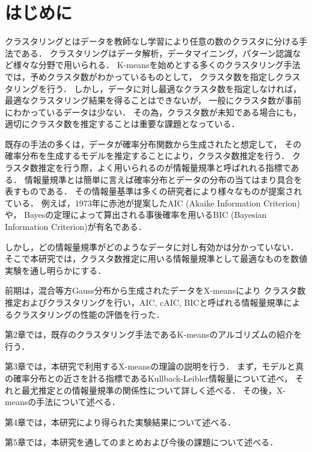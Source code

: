 \section{はじめに}
クラスタリングとはデータを教師なし学習により任意の数のクラスタに分ける手法である．
クラスタリングはデータ解析，データマイニング，パターン認識など様々な分野で用いられる．
K-meansを始めとする多くのクラスタリング手法では，予めクラスタ数がわかっているものとして，
クラスタ数を指定しクラスタリングを行う．
しかし，データに対し最適なクラスタ数を指定しなければ，最適なクラスタリング結果を得ることはできないが，
一般にクラスタ数が事前にわかっているデータは少ない．
その為，クラスタ数が未知である場合にも，適切にクラスタ数を推定することは重要な課題となっている．

既存の手法の多くは，データが確率分布関数から生成されたと想定して，
その確率分布を生成するモデルを推定することにより，クラスタ数推定を行う．
クラスタ数推定を行う際，よく用いられるのが情報量規準と呼ばれれる指標である．
情報量規準とは簡単に言えば確率分布とデータの分布の当てはまり具合を表すものである．
その情報量基準は多くの研究者により様々なものが提案されている．
例えば，1973年に赤池が提案したAIC (Akaike Information Criterion) や，
Bayesの定理によって算出される事後確率を用いるBIC (Bayesian Information Criterion)が有名である．

しかし，どの情報量規準がどのようなデータに対し有効かは分かっていない．
そこで本研究では，クラスタ数推定に用いる情報量規準として最適なものを数値実験を通し明らかにする．

前期は，混合等方Gauss分布から生成されたデータをX-meansにより
クラスタ数推定およびクラスタリングを行い，AIC, cAIC, BICと呼ばれる情報量規準によるクラスタリングの性能の評価を行った．

第2章では，既存のクラスタリング手法であるK-meansのアルゴリズムの紹介を行う．

第3章では，本研究で利用するX-meansの理論の説明を行う．
まず，モデルと真の確率分布との近さを計る指標であるKullback-Leibler情報量について述べ，
それと最尤推定との情報量規準の関係性について詳しく述べる．
その後，X-meansの手法について述べる．

第4章では，本研究により得られた実験結果について述べる．

第5章では，本研究を通してのまとめおよび今後の課題について述べる．
